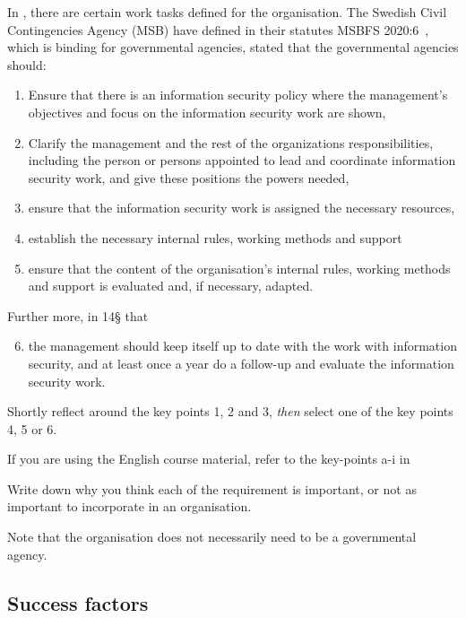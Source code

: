 \documentclass[a4paper]{article}
\begin{document}
In , there are certain work tasks defined for the organisation.
The Swedish Civil Contingencies Agency (MSB) have defined in their statutes
MSBFS 2020:6~\cite{MSBFS2020:6}, which is binding for governmental agencies, 
stated that the governmental agencies should:
\begin{enumerate}
  \item Ensure that there is an information security policy where the
        management's objectives and focus on
        the information security work are shown,
  \item Clarify the management and the rest of the organizations
        responsibilities, including the person or persons appointed to lead and coordinate
        information security work, and give these positions the
        powers needed,
  \item ensure that the information security work is assigned the necessary resources,
  \item establish the necessary internal rules, working methods and support 
  \item ensure that the content of the organisation's internal rules, working methods and support is
    evaluated and, if necessary, adapted.

\end{enumerate}
Further more, in 14§ that

\begin{enumerate}\setcounter{enumi}{5}
  \item the management should keep itself up to date with the work with
    information security, and at least once a year do a follow-up and evaluate
    the information security work.
\end{enumerate}

Shortly reflect around the key points 1, 2 and 3, \emph{then} select one of the key
points 4, 5 or 6.

If you are using the English course material, refer to the key-points a-i in
\cite[chap. 4.2.1]{iso27000}

Write down why you think each of the requirement is important, or not as
important to incorporate in an organisation.

Note that the organisation does not necessarily need to be a governmental
agency.

\subsection{Success factors}
\end{document}
